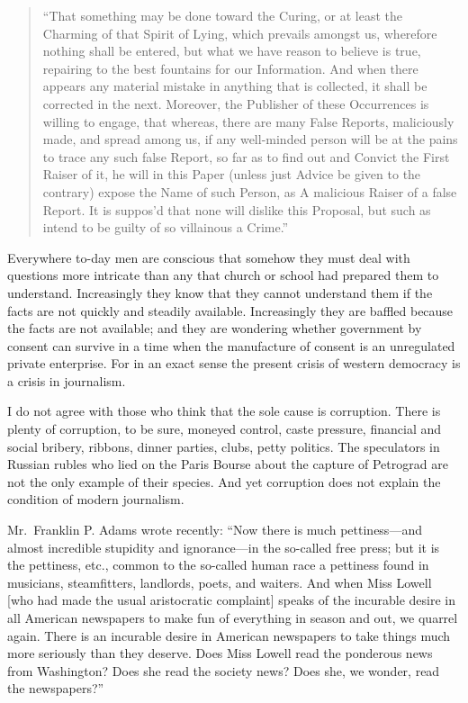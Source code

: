 \documentclass[openany,nobib,nohyper]{tufte-book}
\begin{document}
\begin{quote}
``That something may be done toward the Curing, or at least the Charming
of that Spirit of Lying, which prevails amongst us, wherefore nothing
shall be entered, but what we have reason to believe is true, repairing
to the best fountains for our Information. And when there appears any
material mistake in anything that is collected, it shall be corrected in
the next. Moreover, the Publisher of these Occurrences is willing to
engage, that whereas, there are many False Reports, maliciously made,
and spread among us, if any well-minded person will be at the pains to
trace any such false Report, so far as to find out and Convict the First
Raiser of it, he will in this Paper (unless just Advice be given to the
contrary) expose the Name of such Person, as A malicious Raiser of a
false Report. It is suppos'd that none will dislike this Proposal, but
such as intend to be guilty of so villainous a Crime.''
\end{quote}

Everywhere to-day men are conscious that somehow they must deal with
questions more intricate than any that church or school had prepared
them to understand. Increasingly they know that they cannot understand
them if the facts are not quickly and steadily available. Increasingly
they are baffled because the facts are not available; and they are
wondering whether government by consent can survive in a time when the
manufacture of consent is an unregulated private enterprise. For in an
exact sense the present crisis of western democracy is a crisis in
journalism.

I do not agree with those who think that the sole cause is corruption.
There is plenty of corruption, to be sure, moneyed control, caste
pressure, financial and social bribery, ribbons, dinner parties, clubs,
petty politics. The speculators in Russian rubles who lied on the Paris
Bourse about the capture of Petrograd are not the only example of their
species. And yet corruption does not explain the condition of modern
journalism.

\enlargethispage{\baselineskip}

Mr.~Franklin P. Adams wrote recently: ``Now there is much
pettiness---and almost incredible stupidity and ignorance---in the
so-called free press; but it is the pettiness, etc., common to the
so-called human race a pettiness found in musicians, steamfitters,
landlords, poets, and waiters. And when Miss Lowell {[}who had made the
usual aristocratic complaint{]} speaks of the incurable desire in all
American newspapers to make fun of everything in season and out, we
quarrel again. There is an incurable desire in American newspapers to
take things much more seriously than they deserve. Does Miss Lowell read
the ponderous news from Washington? Does she read the society news? Does
she, we wonder, read the newspapers?''
\end{document}
